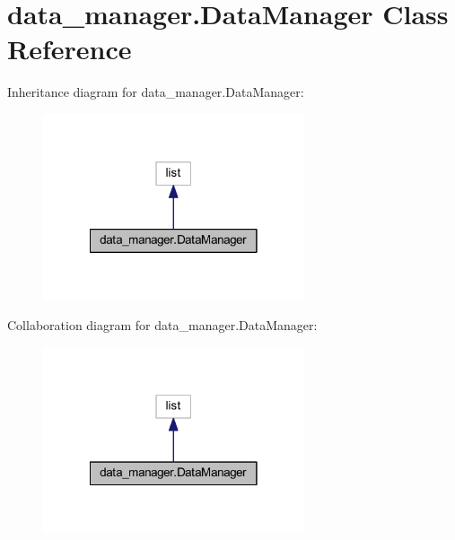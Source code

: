 \hypertarget{classdata__manager_1_1_data_manager}{\section{data\-\_\-manager.\-Data\-Manager Class Reference}
\label{classdata__manager_1_1_data_manager}
}


Inheritance diagram for data\-\_\-manager.\-Data\-Manager\-:
\nopagebreak
\begin{figure}[H]
\begin{center}
\leavevmode
\includegraphics[width=218pt]{classdata__manager_1_1_data_manager__inherit__graph}
\end{center}
\end{figure}


Collaboration diagram for data\-\_\-manager.\-Data\-Manager\-:
\nopagebreak
\begin{figure}[H]
\begin{center}
\leavevmode
\includegraphics[width=218pt]{classdata__manager_1_1_data_manager__coll__graph}
\end{center}
\end{figure}
